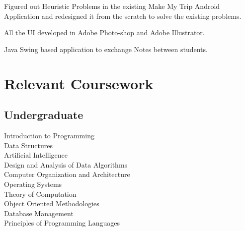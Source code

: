 \documentclass[12pt]{deedy-resume-openfont}
\begin{document}
\vspace{\topsep} 
\begin{tightemize}
\item Figured out Heuristic Problems in the existing Make My Trip Android Application and redesigned it from the scratch to solve the existing problems.
\item All the UI developed in Adobe Photo-shop and Adobe Illustrator.
\end{tightemize}
\sectionsep

\vspace{\topsep} 
\begin{tightemize}
\item Java Swing based application to exchange Notes between students.
\end{tightemize}
\sectionsep


\section{Relevant Coursework}
\subsection{Undergraduate}
Introduction to Programming \\
Data Structures \\
Artificial Intelligence\\
Design and Analysis of Data Algorithms \\
Computer Organization and Architecture \\
Operating Systems \\
Theory of Computation \\
Object Oriented Methodologies \\
Database Management \\
Principles of Programming Languages \\
\sectionsep

\end{document}
